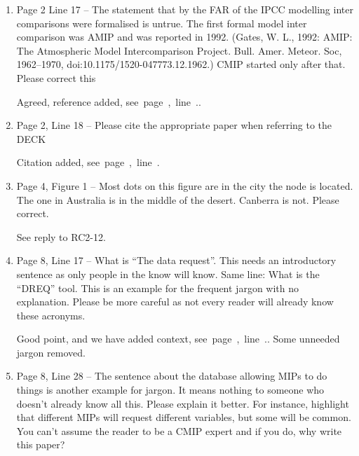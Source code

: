 \documentclass[gmd,manuscript]{copernicus}
\newcommand{\plref}[1]{\mbox{see page \pageref{p-#1}, line
    \lineref{l-#1}.}}
\newenvironment{answer}{\color{blue}}{}
\begin{document}
\begin{enumerate}[label=RC3-\arabic*,leftmargin=*]
  \begin{answer}
    This is a good point raised by RC1 as well, and we have provided
    some context, \plref{RC1-Overview-1}. The text and conclusions
    have been modified as well to make clear the audience and intent.
    A new section on Historical Context has been added,
    Section~\ref{sec:history}.
  \end{answer}

  More minor but often typical issues in chronological ordere
\item Page 2 Line 17 -- The statement that by the FAR of the IPCC
  modelling inter comparisons were formalised is untrue. The first
  formal model inter comparison was AMIP and was reported in 1992.
  (Gates, W. L., 1992: AMIP: The Atmospheric Model Intercomparison
  Project. Bull. Amer. Meteor. Soc, 1962--1970,
  doi:10.1175/1520-047773.12.1962.) CMIP started only after that.
  Please correct this

  \begin{answer}
    Agreed, reference added, \plref{RC1-6}.
  \end{answer}
\item Page 2, Line 18 -- Please cite the appropriate paper when
  referring to the DECK

  \begin{answer}
    Citation added, \plref{RC2-7}
  \end{answer}
\item Page 4, Figure 1 -- Most dots on this figure are in the city the
  node is located. The one in Australia is in the middle of the
  desert. Canberra is not. Please correct.

  \begin{answer}
    See reply to RC2-12.
  \end{answer}
\item Page 8, Line 17 -- What is “The data request”. This needs an
  introductory sentence as only people in the know will know. Same
  line: What is the “DREQ” tool. This is an example for the frequent
  jargon with no explanation. Please be more careful as not every
  reader will already know these acronyms.

  \begin{answer}
    Good point, and we have added context, \plref{RC2-18}. Some
    unneeded jargon removed.
  \end{answer}
\item Page 8, Line 28 -- The sentence about the database allowing MIPs
  to do things is another example for jargon. It means nothing to
  someone who doesn’t already know all this. Please explain it better.
  For instance, highlight that different MIPs will request different
  variables, but some will be common. You can’t assume the reader to
  be a CMIP expert and if you do, why write this paper?


\end{enumerate}
\end{document}
